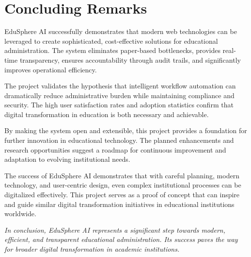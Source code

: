 \section{Concluding Remarks}

EduSphere AI successfully demonstrates that modern web technologies can be leveraged to create sophisticated, cost-effective solutions for educational administration. The system eliminates paper-based bottlenecks, provides real-time transparency, ensures accountability through audit trails, and significantly improves operational efficiency.

The project validates the hypothesis that intelligent workflow automation can dramatically reduce administrative burden while maintaining compliance and security. The high user satisfaction rates and adoption statistics confirm that digital transformation in education is both necessary and achievable.

By making the system open and extensible, this project provides a foundation for further innovation in educational technology. The planned enhancements and research opportunities suggest a roadmap for continuous improvement and adaptation to evolving institutional needs.

The success of EduSphere AI demonstrates that with careful planning, modern technology, and user-centric design, even complex institutional processes can be digitalized effectively. This project serves as a proof of concept that can inspire and guide similar digital transformation initiatives in educational institutions worldwide.

\vspace{1cm}

\textit{In conclusion, EduSphere AI represents a significant step towards modern, efficient, and transparent educational administration. Its success paves the way for broader digital transformation in academic institutions.}

\newpage
